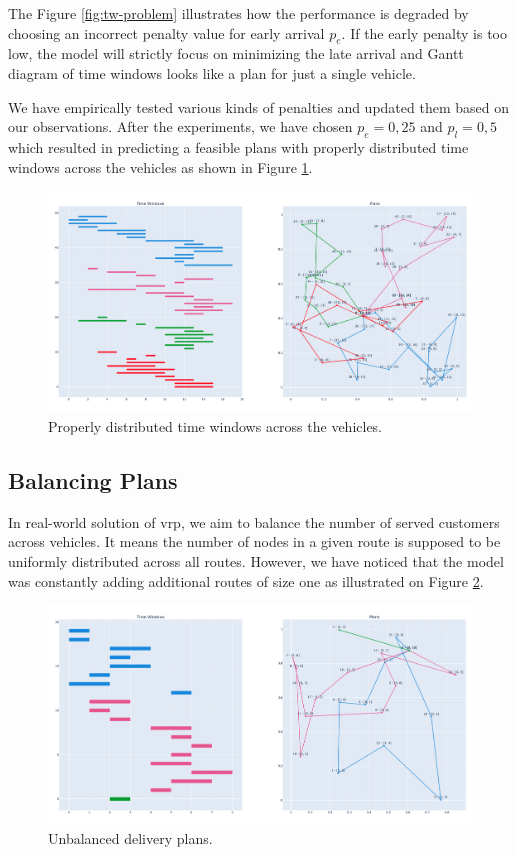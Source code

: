 The Figure \ref{fig:tw-problem} illustrates how the performance is degraded by choosing an incorrect penalty value for early arrival $p_e$. If the early penalty is too low, the model will strictly focus on minimizing the late arrival and Gantt diagram of time windows looks like a plan for just a single vehicle.

We have empirically tested various kinds of penalties and updated them based on our observations. After the experiments, we have chosen $p_e = 0,25$ and $p_l  = 0,5$ which resulted in predicting a feasible plans with properly distributed time windows across the vehicles as shown in Figure \ref{fig:nice-tw}.

\begin{figure}[ht]
    \centering
    \includegraphics[width=1.0\textwidth]{resources/evaluation/sample-50.png}
    \caption{Properly distributed time windows across the vehicles.}
    \label{fig:nice-tw}
\end{figure}

\subsection{Balancing Plans}
In real-world solution of \gls{vrp}, we aim to balance the number of served customers across vehicles. It means the number of nodes in a given route is supposed to be uniformly distributed across all routes. However, we have noticed that the model was constantly adding additional routes of size one as illustrated on Figure \ref{fig:unbalanced}.

\begin{figure}[ht]
    \centering
    \includegraphics[width=1.0\textwidth]{resources/evaluation/unbalanced-plan.png}
    \caption{Unbalanced delivery plans.}
    \label{fig:unbalanced}
\end{figure}

